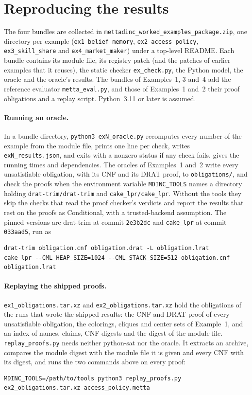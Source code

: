 \documentclass[11pt]{article}
\newcommand{\fpath}[1]{\nolinkurl{#1}}
\newcommand{\code}[1]{\texttt{#1}}
\theoremstyle{definition}
\theoremstyle{plain}
\begin{document}
\section{Reproducing the results}\label{app:repro}

The four bundles are collected in \fpath{mettadinc_worked_examples_package.zip}, one directory per
example (\fpath{ex1_belief_memory}, \fpath{ex2_access_policy}, \fpath{ex3_skill_share} and
\fpath{ex4_market_maker}) under a top-level README. Each bundle contains its module file, its registry
patch (and the patches of earlier examples that it reuses), the static checker \fpath{ex_check.py},
the Python model, the oracle and the oracle's results. The bundles of Examples~1, 3 and~4 add the
reference evaluator \fpath{metta_eval.py}, and those of Examples~1 and~2 their proof obligations and a
replay script. Python~3.11 or later is assumed.

\paragraph{Running an oracle.} In a bundle directory, \code{python3 exN\_oracle.py} recomputes every
number of the example from the module file, prints one line per check, writes \fpath{exN_results.json},
and exits with a nonzero status if any check fails.  gives the running times and
dependencies. The oracles of Examples~1 and~2 write every unsatisfiable obligation, with its CNF and its
DRAT proof, to \fpath{obligations/}, and check the proofs when the environment variable
\fpath{MDINC_TOOLS} names a directory holding \fpath{drat-trim/drat-trim} and \fpath{cake_lpr/cake_lpr}.
Without the tools they skip the checks that read the proof checker's verdicts and report the results
that rest on the proofs as Conditional, with a trusted-backend assumption. The pinned versions are
drat-trim at commit \fpath{2e3b2dc} and \code{cake\_lpr} at commit \fpath{033aad5}, run as
\begin{lstlisting}
drat-trim obligation.cnf obligation.drat -L obligation.lrat
cake_lpr --CML_HEAP_SIZE=1024 --CML_STACK_SIZE=512 obligation.cnf obligation.lrat
\end{lstlisting}

\paragraph{Replaying the shipped proofs.} \fpath{ex1_obligations.tar.xz} and
\fpath{ex2_obligations.tar.xz} hold the obligations of the runs that wrote the shipped results: the CNF
and DRAT proof of every unsatisfiable obligation, the colorings, cliques and center sets of Example~1,
and an index of names, claims, CNF digests and the digest of the module file. \fpath{replay_proofs.py}
needs neither python-sat nor the oracle. It extracts an archive, compares the module digest with the
module file it is given and every CNF with its digest, and runs the two commands above on every proof:
\begin{lstlisting}
MDINC_TOOLS=/path/to/tools python3 replay_proofs.py ex2_obligations.tar.xz access_policy.metta
\end{lstlisting}
\end{document}
